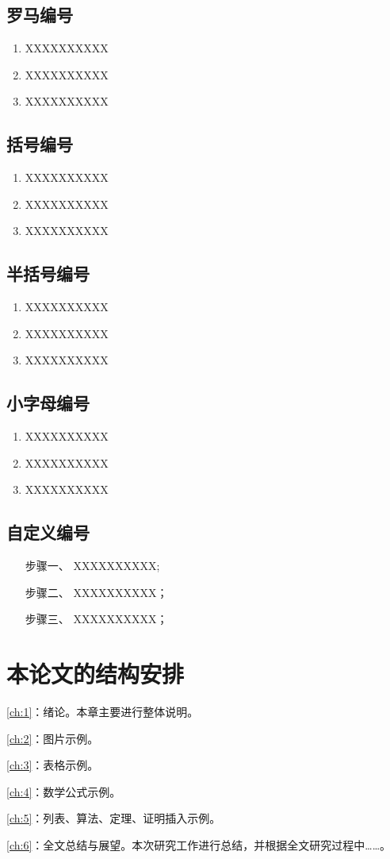 \subsection{罗马编号}
\begin{enumerate}[label=(\roman*)]
 \item XXXXXXXXXX
 \item XXXXXXXXXX
 \item XXXXXXXXXX
\end{enumerate}

\subsection{括号编号}
\begin{enumerate}[label=(\arabic*)]
 \item XXXXXXXXXX
 \item XXXXXXXXXX
 \item XXXXXXXXXX
\end{enumerate}

\subsection{半括号编号}
\begin{enumerate}[label=\arabic*)]
 \item XXXXXXXXXX
 \item XXXXXXXXXX
 \item XXXXXXXXXX
\end{enumerate}

\subsection{小字母编号}
\begin{enumerate}[label=\alph*)]
 \item XXXXXXXXXX
 \item XXXXXXXXXX
 \item XXXXXXXXXX
\end{enumerate}

\subsection{自定义编号}
\begin{enumerate}[leftmargin = 6em, labelsep = 0em]
    \item[步骤一、] XXXXXXXXXX;
    \item[步骤二、] XXXXXXXXXX；
    \item[步骤三、] XXXXXXXXXX；
\end{enumerate}



\section{本论文的结构安排}
\cref{ch:1}：绪论。本章主要进行整体说明。

\cref{ch:2}：图片示例。

\cref{ch:3}：表格示例。

\cref{ch:4}：数学公式示例。

\cref{ch:5}：列表、算法、定理、证明插入示例。

\cref{ch:6}：全文总结与展望。本次研究工作进行总结，并根据全文研究过程中……。


